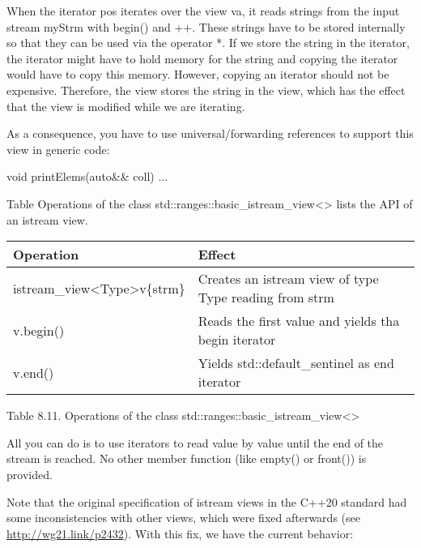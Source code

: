 When the iterator pos iterates over the view va, it reads strings from the input stream myStrm with begin() and ++. These strings have to be stored internally so that they can be used via the operator *. If we store the string in the iterator, the iterator might have to hold memory for the string and copying the iterator would have to copy this memory. However, copying an iterator should not be expensive. Therefore, the view stores the string in the view, which has the effect that the view is modified while we are iterating.

As a consequence, you have to use universal/forwarding references to support this view in generic code:

\begin{cpp}
void printElems(auto&& coll) {
	...
}
\end{cpp}


Table Operations of the class std::ranges::basic\_istream\_view<> lists the API of an istream view.

\begin{longtable}[c]{|l|l|}
\hline
\textbf{Operation} & \textbf{Effect}                                     \\ \hline
\endfirsthead
%
\endhead
%
istream\_view\textless{}Type\textgreater v\{strm\} & Creates an istream view of type Type reading from strm \\ \hline
v.begin()          & Reads the first value and yields tha begin iterator \\ \hline
v.end()            & Yields std::default\_sentinel as end iterator       \\ \hline
\end{longtable}

\begin{center}
Table 8.11. Operations of the class std::ranges::basic\_istream\_view<>
\end{center}

All you can do is to use iterators to read value by value until the end of the stream is reached. No other member function (like empty() or front()) is provided.

Note that the original specification of istream views in the C++20 standard had some inconsistencies with other views, which were fixed afterwards (see \url{http://wg21.link/p2432}). With this fix, we have the current behavior:


